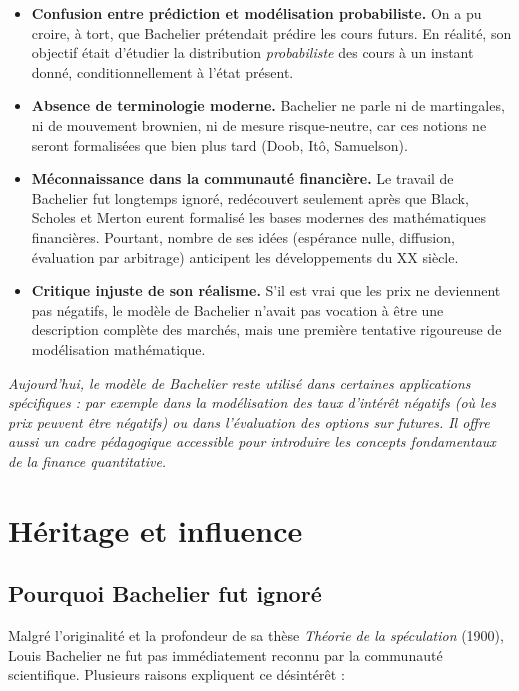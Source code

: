 \documentclass[12pt,a4paper]{article}
\begin{document}
\begin{itemize}
    \item \textbf{Confusion entre prédiction et modélisation probabiliste.} On a pu croire, à tort, que Bachelier prétendait prédire les cours futurs. En réalité, son objectif était d’étudier la distribution \textit{probabiliste} des cours à un instant donné, conditionnellement à l’état présent.

    \item \textbf{Absence de terminologie moderne.} Bachelier ne parle ni de martingales, ni de mouvement brownien, ni de mesure risque-neutre, car ces notions ne seront formalisées que bien plus tard (Doob, Itô, Samuelson).

    \item \textbf{Méconnaissance dans la communauté financière.} Le travail de Bachelier fut longtemps ignoré, redécouvert seulement après que Black, Scholes et Merton eurent formalisé les bases modernes des mathématiques financières. Pourtant, nombre de ses idées (espérance nulle, diffusion, évaluation par arbitrage) anticipent les développements du XX siècle.

    \item \textbf{Critique injuste de son réalisme.} S’il est vrai que les prix ne deviennent pas négatifs, le modèle de Bachelier n’avait pas vocation à être une description complète des marchés, mais une première tentative rigoureuse de modélisation mathématique.
\end{itemize}

\textit{
Aujourd’hui, le modèle de Bachelier reste utilisé dans certaines applications spécifiques : par exemple dans la modélisation des taux d’intérêt négatifs (où les prix peuvent être négatifs) ou dans l’évaluation des options sur futures. Il offre aussi un cadre pédagogique accessible pour introduire les concepts fondamentaux de la finance quantitative.
}

\section{Héritage et influence}

\subsection{Pourquoi Bachelier fut ignoré}

Malgré l’originalité et la profondeur de sa thèse \textit{Théorie de la spéculation} (1900), Louis Bachelier ne fut pas immédiatement reconnu par la communauté scientifique. Plusieurs raisons expliquent ce désintérêt :
\end{document}
